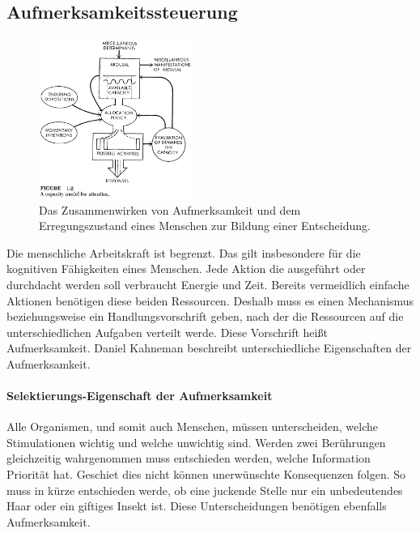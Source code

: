 \documentclass{llncs}					%
\begin{document}
\subsection{Aufmerksamkeitssteuerung}

\begin{figure}[htbp]
	\begin{center}
		\includegraphics[width = 5cm]{Grafiken/28-Attention-Model.png}
		\caption{Das Zusammenwirken von Aufmerksamkeit und dem Erregungszustand eines Menschen zur Bildung einer Entscheidung\cite{kahneman1973attention}.}
		\label{28-Attention-Model}
	\end{center}
\end{figure}

Die menschliche Arbeitskraft ist begrenzt. Das gilt insbesondere für die kognitiven Fähigkeiten eines Menschen. Jede Aktion die ausgeführt oder durchdacht werden soll verbraucht Energie und Zeit. Bereits vermeidlich einfache Aktionen benötigen diese beiden Ressourcen. Deshalb muss es einen Mechanismus beziehungsweise ein Handlungsvorschrift geben, nach der die Ressourcen auf die unterschiedlichen Aufgaben verteilt werde. Diese Vorschrift heißt Aufmerksamkeit.
 Daniel Kahneman \cite{kahneman1973attention} beschreibt unterschiedliche Eigenschaften der Aufmerksamkeit.
 
 	\paragraph{Selektierungs-Eigenschaft der Aufmerksamkeit}
 	Alle Organismen, und somit auch Menschen, müssen unterscheiden, welche Stimulationen wichtig und welche unwichtig sind. Werden zwei Berührungen gleichzeitig wahrgenommen muss entschieden werden, welche Information Priorität hat. Geschiet dies nicht können unerwünschte Konsequenzen folgen. So muss in kürze entschieden werde, ob eine juckende Stelle nur ein unbedeutendes Haar oder ein giftiges Insekt ist. Diese Unterscheidungen benötigen ebenfalls Aufmerksamkeit.
 	
\end{document}
